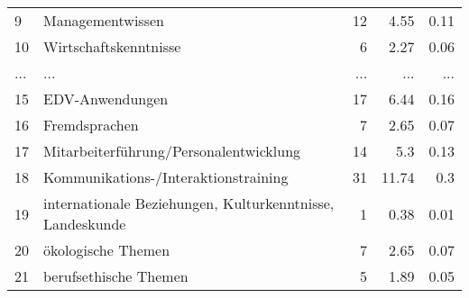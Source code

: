 \begin{longtable}{lXrrr}
        9 & \multicolumn{1}{X}{Managementwissen} & %
          \num{12} &
          \num[round-mode=places,round-precision=2]{4,55} &
          \num[round-mode=places,round-precision=2]{0,11} \\
        10 & \multicolumn{1}{X}{Wirtschaftskenntnisse} & %
          \num{6} &
          \num[round-mode=places,round-precision=2]{2,27} &
          \num[round-mode=places,round-precision=2]{0,06} \\
       ... & ... & ... & ... & ... \\
        15 & \multicolumn{1}{X}{EDV-Anwendungen} & %
          \num{17} &
          \num[round-mode=places,round-precision=2]{6,44} &
          \num[round-mode=places,round-precision=2]{0,16} \\

        16 & \multicolumn{1}{X}{Fremdsprachen} & %
          \num{7} &
          \num[round-mode=places,round-precision=2]{2,65} &
          \num[round-mode=places,round-precision=2]{0,07} \\

        17 & \multicolumn{1}{X}{Mitarbeiterführung/Personalentwicklung} & %
          \num{14} &
          \num[round-mode=places,round-precision=2]{5,3} &
          \num[round-mode=places,round-precision=2]{0,13} \\

        18 & \multicolumn{1}{X}{Kommunikations-/Interaktionstraining} & %
          \num{31} &
          \num[round-mode=places,round-precision=2]{11,74} &
          \num[round-mode=places,round-precision=2]{0,3} \\

        19 & \multicolumn{1}{X}{internationale Beziehungen, Kulturkenntnisse, Landeskunde} & %
          \num{1} &
          \num[round-mode=places,round-precision=2]{0,38} &
          \num[round-mode=places,round-precision=2]{0,01} \\

        20 & \multicolumn{1}{X}{ökologische Themen} & %
          \num{7} &
          \num[round-mode=places,round-precision=2]{2,65} &
          \num[round-mode=places,round-precision=2]{0,07} \\

        21 & \multicolumn{1}{X}{berufsethische Themen} & %
          \num{5} &
          \num[round-mode=places,round-precision=2]{1,89} &
          \num[round-mode=places,round-precision=2]{0,05} \\


\end{longtable}
